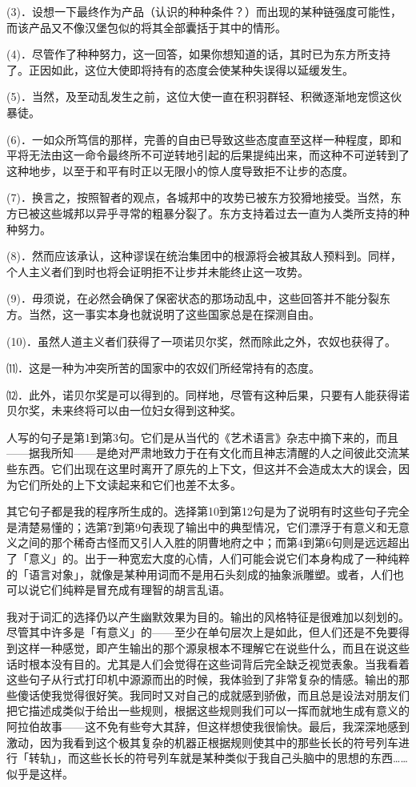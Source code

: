 \documentclass[
  12pt,
  twoside,
  openright,
  oldfontcommands,
]{memoir}
\begin{document}
(3)．设想一下最终作为产品（认识的种种条件？）而出现的某种链强度可能性，而该产品又不像汉堡包似的将其全部囊括于其中的情形。

(4)．尽管作了种种努力，这一回答，如果你想知道的话，其时已为东方所支持了。正因如此，这位大使即将持有的态度会使某种失误得以延缓发生。

(5)．当然，及至动乱发生之前，这位大使一直在积羽群轻、积微逐渐地宠惯这伙暴徒。

(6)．一如众所笃信的那样，完善的自由已导致这些态度直至这样一种程度，即和平将无法由这一命令最终所不可逆转地引起的后果提纯出来，而这种不可逆转到了这种地步，以至于和平有时正以无限小的惊人度导致拒不让步的态度。

(7)．换言之，按照智者的观点，各城邦中的攻势已被东方狡猾地接受。当然，东方已被这些城邦以异乎寻常的粗暴分裂了。东方支持着过去一直为人类所支持的种种努力。

(8)．然而应该承认，这种谬误在统治集团中的根源将会被其敌人预料到。同样，个人主义者们到时也将会证明拒不让步并未能终止这一攻势。

(9)．毋须说，在必然会确保了保密状态的那场动乱中，这些回答并不能分裂东方。当然，这一事实本身也就说明了这些国家总是在探测自由。

(10)．虽然人道主义者们获得了一项诺贝尔奖，然而除此之外，农奴也获得了。

⑾．这是一种为冲突所苦的国家中的农奴们所经常持有的态度。

⑿．此外，诺贝尔奖是可以得到的。同样地，尽管有这种后果，只要有人能获得诺贝尔奖，未来终将可以由一位妇女得到这种奖。

人写的句子是第1到第3句。它们是从当代的《艺术语言》杂志中摘下来的，而且------据我所知------是绝对严肃地致力于在有文化而且神志清醒的人之间彼此交流某些东西。它们出现在这里时离开了原先的上下文，但这并不会造成太大的误会，因为它们所处的上下文读起来和它们也差不太多。

其它句子都是我的程序所生成的。选择第10到第12句是为了说明有时这些句子完全是清楚易懂的；选第7到第9句表现了输出中的典型情况，它们漂浮于有意义和无意义之间的那个稀奇古怪而又引人入胜的阴曹地府之中；而第4到第6句则是远远超出了「意义」的。出于一种宽宏大度的心情，人们可能会说它们本身构成了一种纯粹的「语言对象」，就像是某种用词而不是用石头刻成的抽象派雕塑。或者，人们也可以说它们纯粹是冒充成有理智的胡言乱语。

我对于词汇的选择仍以产生幽默效果为目的。输出的风格特征是很难加以刻划的。尽管其中许多是「有意义」的------至少在单句层次上是如此，但人们还是不免要得到这样一种感觉，即产生输出的那个源泉根本不理解它在说些什么，而且在说这些话时根本没有目的。尤其是人们会觉得在这些词背后完全缺乏视觉表象。当我看着这些句子从行式打印机中源源而出的时候，我体验到了非常复杂的情感。输出的那些傻话使我觉得很好笑。我同时又对自己的成就感到骄傲，而且总是设法对朋友们把它描述成类似于给出一些规则，根据这些规则我们可以一挥而就地生成有意义的阿拉伯故事------这不免有些夸大其辞，但这样想使我很愉快。最后，我深深地感到激动，因为我看到这个极其复杂的机器正根据规则使其中的那些长长的符号列车进行「转轨」，而这些长长的符号列车就是某种类似于我自己头脑中的思想的东西\ldots\ldots 似乎是这样。
\end{document}

